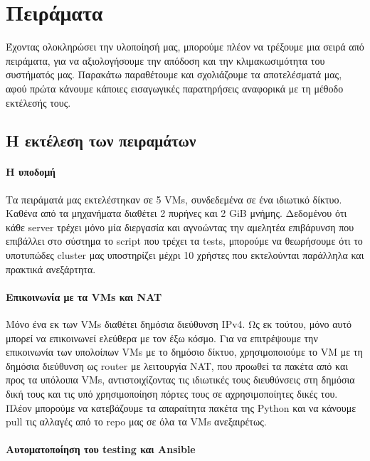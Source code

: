 \documentclass[titlepage]{article}
\begin{document}
\section{Πειράματα}

Έχοντας ολοκληρώσει την υλοποίησή μας, μπορούμε πλέον να τρέξουμε μια σειρά από πειράματα, για να αξιολογήσουμε την απόδοση και την κλιμακωσιμότητα του συστήματός μας. Παρακάτω παραθέτουμε και σχολιάζουμε τα αποτελέσματά μας, αφού πρώτα κάνουμε κάποιες εισαγωγικές παρατηρήσεις αναφορικά με τη μέθοδο εκτέλεσής τους.

\subsection{Η εκτέλεση των πειραμάτων}

\paragraph{Η υποδομή}

Τα πειράματά μας εκτελέστηκαν σε 5 VMs, συνδεδεμένα σε ένα ιδιωτικό δίκτυο. Καθένα από τα μηχανήματα διαθέτει 2 πυρήνες και 2 GiB μνήμης. Δεδομένου ότι κάθε server τρέχει μόνο μία διεργασία και αγνοώντας την αμελητέα επιβάρυνση που επιβάλλει στο σύστημα το script που τρέχει τα tests, μπορούμε να θεωρήσουμε ότι το υποτυπώδες cluster μας υποστηρίζει μέχρι 10 χρήστες που εκτελούνται παράλληλα και πρακτικά ανεξάρτητα.

\paragraph{Επικοινωνία με τα VMs και NAT}

Μόνο ένα εκ των VMs διαθέτει δημόσια διεύθυνση IPv4. Ως εκ τούτου, μόνο αυτό μπορεί να επικοινωνεί ελεύθερα με τον έξω κόσμο. Για να επιτρέψουμε την επικοινωνία των υπολοίπων VMs με το δημόσιο δίκτυο, χρησιμοποιούμε το VM με τη δημόσια διεύθυνση ως router με λειτουργία NAT, που προωθεί τα πακέτα από και προς τα υπόλοιπα VMs, αντιστοιχίζοντας τις ιδιωτικές τους διευθύνσεις στη δημόσια δική τους και τις υπό χρησιμοποίηση πόρτες τους σε αχρησιμοποίητες δικές του. Πλέον μπορούμε να κατεβάζουμε τα απαραίτητα πακέτα της Python και να κάνουμε pull τις αλλαγές από το repo μας σε όλα τα VMs ανεξαιρέτως.

\paragraph{Αυτοματοποίηση του testing και Ansible}
\end{document}
